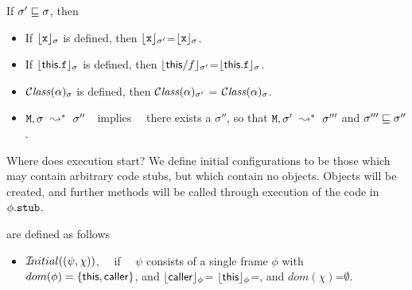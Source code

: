  
\begin{lemma}
If $\sigma'  \sqsubseteq \sigma$, then

\begin{itemize}
\item
If ${\lfloor{ {{\mbox{\tt{x}}}}}\rfloor_{\sigma}}$ is defined, then ${\lfloor{ {{\mbox{\tt{x}}}}}\rfloor_{\sigma'}}$=${\lfloor{ {{\mbox{\tt{x}}}}}\rfloor_{\sigma}}$.
\item
If ${\lfloor{ {{\bf{\sf {this}}}.{\mbox{\tt{f}}}}}\rfloor_{\sigma}}$ is defined, then ${\lfloor{ {{\bf{\sf {this}}}/f}}\rfloor_{\sigma'}}$=${\lfloor{ {{\bf{\sf {this}}}.{\mbox{\tt{f}}}}}\rfloor_{\sigma}}$.
\item
${\mathcal C}{\mathit{lass}}(\alpha)_{\sigma} $  is defined, then  ${\mathcal C}{\mathit{lass}}(\alpha)_{\sigma'} $  = ${\mathcal C}{\mathit{lass}}(\alpha)_{\sigma} $. 
\item
$\M, \sigma \ \leadsto^*\ \sigma''$\ \ implies    \ \ there exists a $\sigma''$, so that $\M, \sigma'\ \leadsto^*\ \sigma'''$
and $\sigma''' \sqsubseteq \sigma''$.
\end{itemize}
\end{lemma}



Where does execution start? We define initial configurations to be those which may contain arbitrary code stubs, but which contain no objects. Objects will be created, and further methods will be called through execution of the code in $\phi.{\mbox{\tt{stub}}}$.

\begin{definition} are defined as follows \\

\begin{itemize}
     \item 
   ${{\mathcal I}\!nitial}((\psi,\chi))$, \ \ if \ \ $\psi$ consists of a single frame $\phi$ with $dom(\phi)=\{ {\bf{\sf {this}}}, {\bf{\sf {caller}}} \}$, and ${\lfloor{ {{\bf{\sf {caller}}}}}\rfloor_{\phi}}$= ${\lfloor{ {{\bf{\sf {this}}}}}\rfloor_{\phi}}$=\nullK, and $dom(\chi)$=$\emptyset$.
 \end{itemize}

\end{definition}

